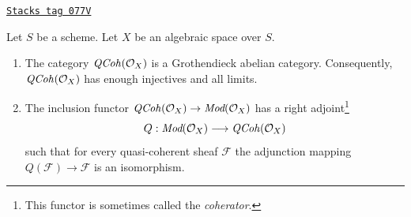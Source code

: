 \begin{proposition}[Coherator]
\label{spaces-properties-proposition-coherator}
\href{https://stacks.math.columbia.edu/tag/077V}{\texttt{Stacks tag 077V}}

Let $S$ be a scheme. Let $X$ be an algebraic space over $S$.
\begin{enumerate}
\item The category $\mathit{QCoh}(\mathcal{O}_X)$ is a Grothendieck
abelian category. Consequently, $\mathit{QCoh}(\mathcal{O}_X)$
has enough injectives and all limits.
\item The inclusion functor
$\mathit{QCoh}(\mathcal{O}_X) \to \textit{Mod}(\mathcal{O}_X)$
has a right adjoint\footnote{This functor is sometimes called
the {\it coherator}.}
$$
Q : \textit{Mod}(\mathcal{O}_X) \longrightarrow \mathit{QCoh}(\mathcal{O}_X)
$$
such that for every quasi-coherent sheaf $\mathcal{F}$ the adjunction mapping
$Q(\mathcal{F}) \to \mathcal{F}$ is an isomorphism.
\end{enumerate}
\end{proposition}


